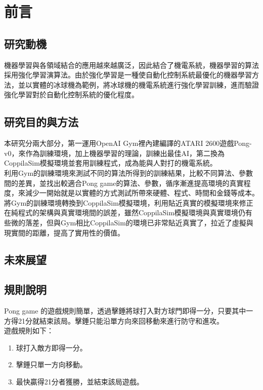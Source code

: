 \documentclass[14pt,a4paper]{report}  %
\begin{document}
\chapter{前言}
\renewcommand{\baselinestretch}{10.0} %
\setcounter{page}{1}  %
\fontsize{14pt}{2.5pt}\sectionef
\section{研究動機}
 機器學習與各領域結合的應用越來越廣泛，因此結合了機電系統，機器學習的算法採用強化學習演算法。由於強化學習是一種使自動化控制系統最優化的機器學習方法，並以實體的冰球機為範例，將冰球機的機電系統進行強化學習訓練，進而驗證強化學習對於自動化控制系統的優化程度。
 
\section{研究目的與方法}
 本研究分兩大部分，第一運用OpenAI Gym裡內建編譯的ATARI 2600遊戲Pong-v0，來作為訓練環境，加上機器學習的理論，訓練出最佳AI，第二換為CoppilaSim模擬環境並套用訓練程式，成為能與人對打的機電系統。\\
 
 利用Gym的訓練環境來測試不同的算法所得到的訓練結果，比較不同算法、參數間的差異，並找出較適合Pong game的算法、參數，循序漸進提高環境的真實程度，來減少一開始就是以實體的方式測試所帶來硬體、程式、時間和金錢等成本。\\

 將Gym的訓練環境轉換到CoppilaSim模擬環境，利用貼近真實的模擬環境來修正在純程式的架構與真實環境間的誤差，雖然CoppilaSim模擬環境與真實環境仍有些微的落差，但與Gym相比CoppilaSim的環境已非常貼近真實了，拉近了虛擬與現實間的距離，提高了實用性的價值。
\section{未來展望}
\qquad 
\section{規則說明}
 Pong game 的遊戲規則簡單，透過擊錘將球打入對方球門即得一分，只要其中一方得21分就結束該局。擊錘只能沿單方向來回移動來進行防守和進攻。\\
遊戲規則如下：
\begin{enumerate}
\item 球打入敵方即得一分。
\item 擊錘只單一方向移動。
\item 最快贏得21分者獲勝，並結束該局遊戲。
\end{enumerate}
\end{document}
